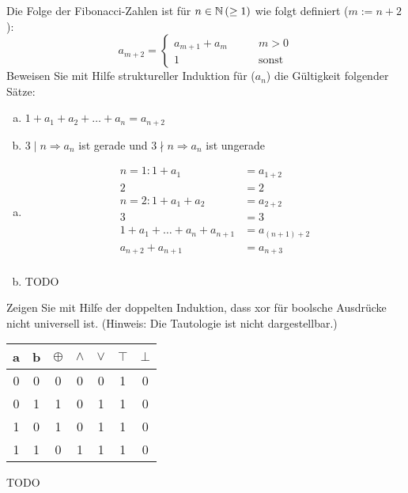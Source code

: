 \begin{card}
  Die Folge der Fibonacci-Zahlen ist für $n \in \mathbb{N} \, (\geq 1)$ wie folgt definiert ($m := n+2$):
  \[
    a_{m+2} =
\begin{cases}
  a_{m+1} + a_{m} & \qquad m > 0 \\
  1 & \qquad \text{sonst}
\end{cases}
  \]
  Beweisen Sie mit Hilfe struktureller Induktion für ($a_n$) die Gültigkeit folgender Sätze:
  \begin{enumerate}[a)]
    \item $1 + a_1 + a_2 + \ldots + a_n = a_{n+2}$
    \item $3 \mid n \Rightarrow a_{n}$ ist gerade und $3 \nmid n \Rightarrow a_{n}$ ist ungerade
	\end{enumerate}
	\hr
  \begin{enumerate}[a)]
	  \item
	    \begin{align*}
        n = 1: 1+a_1 &= a_{1+2} \\
        2 &= 2 \\
        n = 2: 1+a_1+a_2 &= a_{2+2} \\
        3 &= 3 \\
        1 + a_1 + \ldots + a_n + a_{n+1} &= a_{(n+1)+2} \\
        a_{n+2} + a_{n+1} &= a_{n+3} \\
	    \end{align*}
	  \item TODO
	\end{enumerate}
\end{card}

\begin{card}
  Zeigen Sie mit Hilfe der doppelten Induktion, dass xor für boolsche Ausdrücke nicht universell ist. (Hinweis: Die
  Tautologie ist nicht dargestellbar.)
	\hr
  \begin{tabular}{cc|c|c|c|c|c}
    a & b & $\oplus$ & $\land$ & $\lor$ & $\top$ & $\bot$ \\ \hline
    0 & 0 & 0 & 0 & 0 & 1 & 0 \\
    0 & 1 & 1 & 0 & 1 & 1 & 0 \\
    1 & 0 & 1 & 0 & 1 & 1 & 0 \\
    1 & 1 & 0 & 1 & 1 & 1 & 0 \\
  \end{tabular}
  TODO
\end{card}

